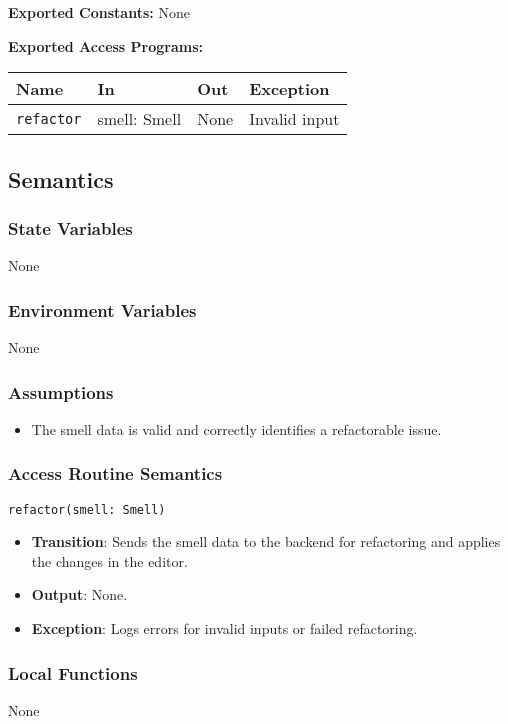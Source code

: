 \documentclass[12pt, titlepage]{article}
\begin{document}
\textbf{Exported Constants:} None

\textbf{Exported Access Programs:}\\
\begin{tabularx}{\linewidth}{|l|>{\raggedright\arraybackslash}X|l|l|}
  \hline
  \textbf{Name} & \textbf{In} & \textbf{Out} & \textbf{Exception}\\
  \hline
  \texttt{refactor} & {smell: Smell} & None & Invalid input \\
  \hline
\end{tabularx}

\subsection{Semantics}

\subsubsection{State Variables}
None

\subsubsection{Environment Variables}
None


\subsubsection{Assumptions}
\begin{itemize}
\item The smell data is valid and correctly identifies a refactorable issue.
\end{itemize}

\subsubsection{Access Routine Semantics}
\texttt{refactor(smell: Smell)}
\begin{itemize}
\item \textbf{Transition}: Sends the smell data to the backend for refactoring and applies the changes in the editor.
\item \textbf{Output}: None.
\item \textbf{Exception}: Logs errors for invalid inputs or failed refactoring.
\end{itemize}

\subsubsection{Local Functions}
None
\end{document}
